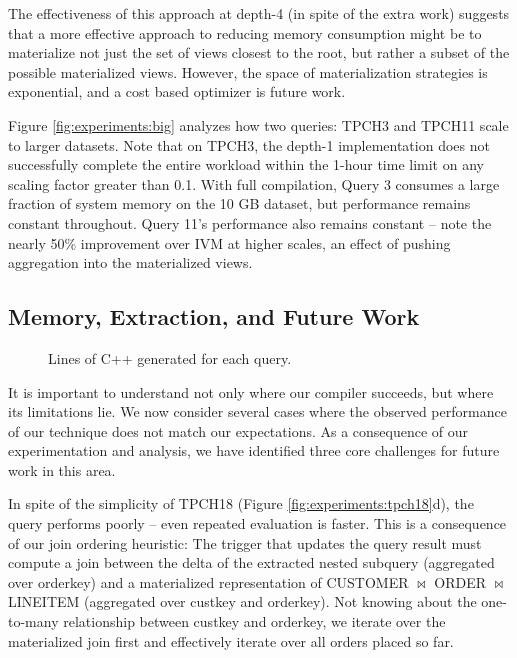 The effectiveness of this approach at depth-4 (in spite of the extra work) suggests that a more effective approach to reducing memory consumption might be to materialize not just the set of views closest to the root, but rather a subset of the possible materialized views.  However, the space of materialization strategies is exponential, and a cost based optimizer is future work.

Figure \ref{fig:experiments:big} analyzes how two queries: TPCH3 and TPCH11 scale to larger datasets.  Note that on TPCH3, the depth-1 implementation does not successfully complete the entire workload within the 1-hour time limit on any scaling factor greater than 0.1.  With full compilation, Query 3 consumes a large fraction of system memory on the 10 GB dataset, but performance remains constant throughout.  Query 11's performance also remains constant -- note the nearly 50\% improvement over IVM at higher scales, an effect of pushing aggregation into the materialized views.

\subsection{Memory, Extraction, and Future Work}
\label{sec:experiments:future}

\begin{figure}
\begin{center}

\caption{Lines of C++ generated for each query.}
\label{fig:experiments:loc}
\end{center}
\vspace*{-0.35in}
\end{figure}

It is important to understand not only where our compiler succeeds, but where its limitations lie.  We now consider several cases where the observed performance of our technique does not match our expectations.  As a consequence of our experimentation and analysis, we have identified three core challenges for future work in this area.

In spite of the simplicity of TPCH18 (Figure \ref{fig:experiments:tpch18}d), the query performs poorly -- even repeated evaluation is faster.  This is a consequence of our join ordering heuristic: The trigger that updates the query result must compute a join between the delta of the extracted nested subquery (aggregated over orderkey) and a materialized representation of CUSTOMER $\bowtie$ ORDER $\bowtie$ LINEITEM (aggregated over custkey and orderkey).  
Not knowing about the one-to-many relationship between custkey and orderkey, we iterate over the materialized join first and effectively iterate over all orders placed so far.

